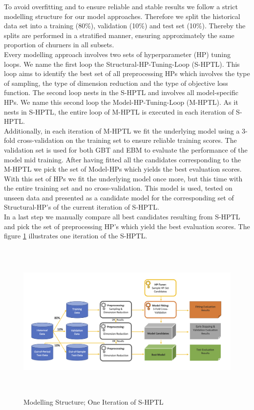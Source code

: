 \documentclass[12pt,titlepage]{article}
\begin{document}
To avoid overfitting and to ensure reliable and stable results we follow a strict modelling structure for our model approaches. Therefore we split the historical data set into a training (80$\%$), validation (10$\%$) and test set (10$\%$). Thereby the splits are performed in a stratified manner, ensuring approximately the same proportion of churners in all subsets. \\
Every modelling approach involves two sets of hyperparameter (HP) tuning loops. We name the first loop the Structural-HP-Tuning-Loop (S-HPTL). This loop aims to identify the best set of all preprocessing HPs which involves the type of sampling, the type of dimension reduction and the type of objective loss function. The second loop nests in the S-HPTL and involves all model-specific HPs. We name this second loop the Model-HP-Tuning-Loop (M-HPTL). As it nests in S-HPTL, the entire loop of M-HPTL is executed in each iteration of S-HPTL. \\
Additionally, in each iteration of M-HPTL we fit the underlying model using a 3-fold cross-validation on the training set to ensure reliable training scores. The validation set is used for both GBT and EBM to evaluate the performance of the model mid training. After having fitted all the candidates corresponding to the M-HPTL we pick the set of Model-HPs which yields the best evaluation scores. With this set of HPs we fit the underlying model once more, but this time with the entire training set and no cross-validation. This model is used, tested on unseen data and presented as a candidate model for the corresponding set of Structural-HP's of the current iteration of S-HPTL. \\
In a last step we manually compare all best candidates resulting from S-HPTL and pick the set of preprocessing HP's which yield the best evaluation scores. The figure \ref{fig:shptl} illustrates one iteration of the S-HPTL. \\
\begin{figure}[H]
    \centerline{\includegraphics[height=8cm]{fitting_tuning_viz.png}}
\caption{Modelling Structure; One Iteration of S-HPTL}
\label{fig:shptl}
\end{figure}
\end{document}
